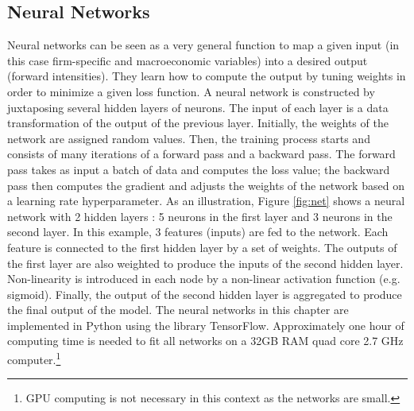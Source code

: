 \subsection{Neural Networks}
\label{SS:2-2}

Neural networks can be seen as a very general function to map a given input (in this case firm-specific and macroeconomic variables) into a desired output (forward intensities). 
They learn how to compute the output by tuning weights in order to minimize a given loss function. A neural network is constructed by juxtaposing several hidden layers of neurons. The input of each layer is a data transformation of the output of the previous layer. Initially, the weights of the network are assigned random values. Then, the training process starts and consists of many iterations of a forward pass and a backward pass. The forward pass takes as input a batch of data and computes the loss value; the backward pass then computes the gradient and adjusts the weights of the network based on a learning rate hyperparameter. As an illustration, Figure \ref{fig:net} shows a neural network with 2 hidden layers : 5 neurons in the first layer and 3 neurons in the second layer. In this example, 3 features (inputs) are fed to the network. Each feature is connected to the first hidden layer by a set of weights. The outputs of the first layer are also weighted to produce the inputs of the second hidden layer. Non-linearity is introduced in each node by a non-linear activation function (e.g. sigmoid). Finally, the output of the second hidden layer is aggregated to produce the final output of the model. The neural networks in this chapter are implemented in Python using the library TensorFlow. Approximately one hour of computing time is needed to fit all networks on a 32GB RAM quad core 2.7 GHz computer.\footnote{GPU computing is not necessary in this context as the networks are small.}

